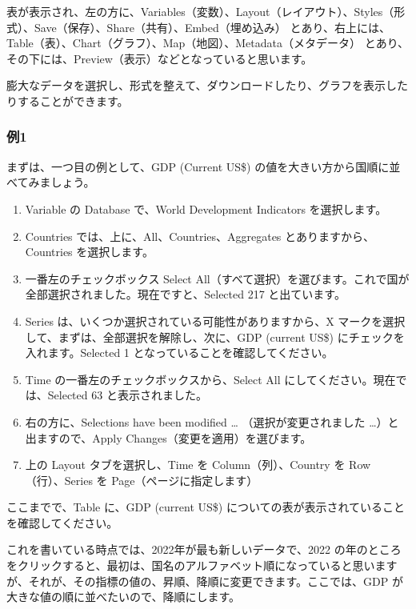 \documentclass[
  xelatex, ja=standard]{bxjsbook}
\theoremstyle{definition}
\theoremstyle{definition}
\theoremstyle{definition}
\theoremstyle{definition}
\theoremstyle{remark}
\begin{document}
表が表示され、左の方に、Variables（変数）、Layout（レイアウト）、Styles（形式）、Save（保存）、Share（共有）、Embed（埋め込み） とあり、右上には、Table（表）、Chart（グラフ）、Map（地図）、Metadata（メタデータ） とあり、その下には、Preview（表示）などとなっていると思います。

膨大なデータを選択し、形式を整えて、ダウンロードしたり、グラフを表示したりすることができます。

\hypertarget{ux4f8b1}{%
\subsubsection{例1}\label{ux4f8b1}}

まずは、一つ目の例として、GDP (Current US\$) の値を大きい方から国順に並べてみましょう。

\begin{enumerate}
\def\labelenumi{\arabic{enumi}.}
\item
  Variable の Database で、World Development Indicators を選択します。
\item
  Countries では、上に、All、Countries、Aggregates とありますから、Countries を選択します。
\item
  一番左のチェックボックス Select All（すべて選択）を選びます。これで国が全部選択されました。現在ですと、Selected 217 と出ています。
\item
  Series は、いくつか選択されている可能性がありますから、X マークを選択して、まずは、全部選択を解除し、次に、GDP (current US\$) にチェックを入れます。Selected 1 となっていることを確認してください。
\item
  Time の一番左のチェックボックスから、Select All にしてください。現在では、Selected 63 と表示されました。
\item
  右の方に、Selections have been modified \ldots{} （選択が変更されました \ldots）と出ますので、Apply Changes（変更を適用）を選びます。
\item
  上の Layout タブを選択し、Time を Column（列）、Country を Row（行）、Series を Page（ページに指定します）
\end{enumerate}

ここまでで、Table に、GDP (current US\$) についての表が表示されていることを確認してください。

これを書いている時点では、2022年が最も新しいデータで、2022 の年のところをクリックすると、最初は、国名のアルファベット順になっていると思いますが、それが、その指標の値の、昇順、降順に変更できます。ここでは、GDP が大きな値の順に並べたいので、降順にします。
\end{document}
